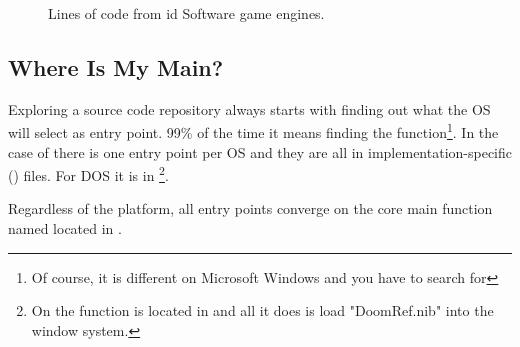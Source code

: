 \par
\begin{figure}[H]
\centering
   \caption{Lines of code from id Software game engines.}
 \end{figure}
\par

\subsection{Where Is My Main?}
Exploring a source code repository always starts with finding out what the OS will select as entry point. 99\% of the time it means finding the  function\footnote{Of course, it is different on Microsoft Windows and you have to search for }. In the case of \doom{} there is one entry point per OS and they are all in implementation-specific () files. For DOS it is in \footnote{On \NeXT the  function is located in  and all it does is load "DoomRef.nib" into the window system.}.\\
\par
Regardless of the platform, all entry points converge on the core main function named  located in .\\ 
\par

